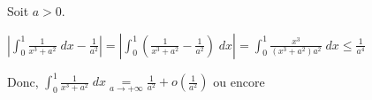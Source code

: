 {{\begin{center}
\end{center}
Soit $a>0$.

\begin{center}
$\left|\int_{0}^{1}\frac{1}{x^3+a^2}\;dx -\frac{1}{a^2}\right| =\left|\int_{0}^{1}\left(\frac{1}{x^3+a^2}-\frac{1}{a^2}\right)\;dx\right| =\int_{0}^{1}\frac{x^3}{(x^3+a^2)a^2}\;dx\leqslant\frac{1}{a^4}$
\end{center}

Donc, $\int_{0}^{1}\frac{1}{x^3+a^2}\;dx\underset{a\rightarrow+\infty}{=}\frac{1}{a^2}+o\left(\frac{1}{a^2}\right)$ ou encore

\begin{center}
\end{center}
}
}
